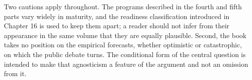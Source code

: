 Two cautions apply throughout. The programs described in the fourth and fifth parts vary widely in maturity, and the readiness classification introduced in Chapter 16 is used to keep them apart; a reader should not infer from their appearance in the same volume that they are equally plausible. Second, the book takes no position on the empirical forecasts, whether optimistic or catastrophic, on which the public debate turns. The conditional form of the central question is intended to make that agnosticism a feature of the argument and not an omission from it.
